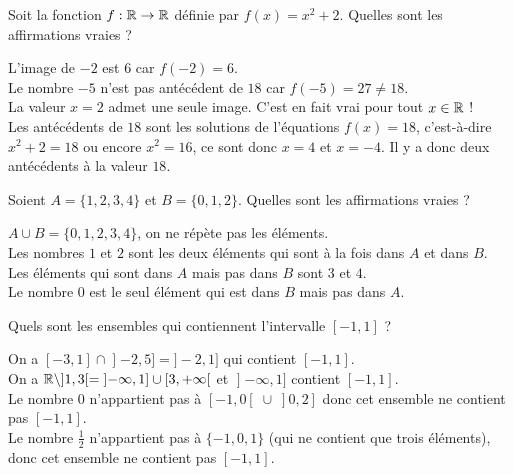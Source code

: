 \begin{question}
Soit la fonction $f : \mathbb{R} \to \mathbb{R}$ définie par $f(x) = x^2+2$.
Quelles sont les affirmations vraies ?
\begin{answers} 
\end{answers}
\begin{explanations} 
L'image de $-2$ est $6$ car $f(-2) = 6$. \\
Le nombre $-5$ n'est pas antécédent de $18$ car $f(-5) = 27 \neq 18$. \\
La valeur $x=2$ admet une seule image. C'est en fait vrai pour tout $x\in\mathbb{R}$ !\\
Les antécédents de $18$ sont les solutions de l'équations $f(x) = 18$, c'est-à-dire $x^2+2=18$ ou encore $x^2=16$, ce sont donc $x=4$ et $x=-4$. Il y a donc deux antécédents à la valeur $18$.
\end{explanations}
\end{question}


\begin{question}
Soient $A=\{1,2,3,4\}$ et $B=\{0,1,2\}$. Quelles sont les affirmations vraies ?
\begin{answers} 
\end{answers}
\begin{explanations}
$A\cup B=\{0,1,2,3,4\}$, on ne répète pas les éléments.\\
Les nombres $1$ et $2$ sont les deux éléments qui sont à la fois dans $A$ et dans $B$.\\
Les éléments qui sont dans $A$ mais pas dans $B$ sont $3$ et $4$.\\
Le nombre $0$ est le seul élément qui est dans $B$ mais pas dans $A$.
\end{explanations}
\end{question}


\begin{question}
Quels sont les ensembles qui contiennent l'intervalle $[-1,1]$ ?
\begin{answers} 
	\good{$[-3,1] \cap \mathopen]-2,5]$}
	\good{$\Rr \setminus ]1,3[$}
	\bad{$[-1,0[ \; \cup \; ]0,2]$}
\end{answers}
\begin{explanations}
On a $[-3,1] \cap  \mathopen]-2,5] = ]-2,1]$ qui contient $[-1,1]$. \\
On a $\mathbb{R} \setminus ]1,3[=\mathopen]-\infty,1]\cup[3,+\infty\mathclose[$ et $\mathopen]-\infty,1]$ contient $[-1,1]$.\\
Le nombre $0$ n'appartient pas à $[-1,0[ \; \cup \; ]0,2]$  donc cet ensemble ne contient pas $[-1,1]$. \\
Le nombre $\frac12$ n'appartient pas à $\{-1,0,1\}$ (qui ne contient que trois éléments), donc cet ensemble ne contient pas $[-1,1]$. \\ 
\end{explanations}
\end{question}


